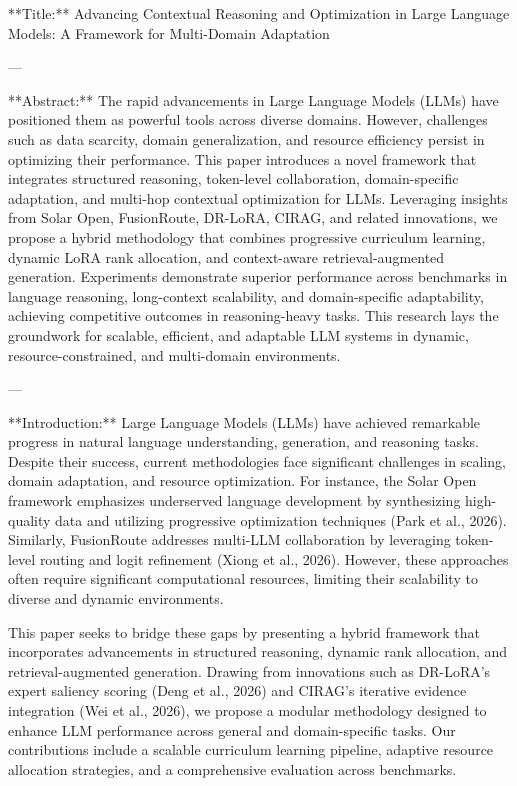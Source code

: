 **Title:** Advancing Contextual Reasoning and Optimization in Large Language Models: A Framework for Multi-Domain Adaptation  

---

**Abstract:**  
The rapid advancements in Large Language Models (LLMs) have positioned them as powerful tools across diverse domains. However, challenges such as data scarcity, domain generalization, and resource efficiency persist in optimizing their performance. This paper introduces a novel framework that integrates structured reasoning, token-level collaboration, domain-specific adaptation, and multi-hop contextual optimization for LLMs. Leveraging insights from Solar Open, FusionRoute, DR-LoRA, CIRAG, and related innovations, we propose a hybrid methodology that combines progressive curriculum learning, dynamic LoRA rank allocation, and context-aware retrieval-augmented generation. Experiments demonstrate superior performance across benchmarks in language reasoning, long-context scalability, and domain-specific adaptability, achieving competitive outcomes in reasoning-heavy tasks. This research lays the groundwork for scalable, efficient, and adaptable LLM systems in dynamic, resource-constrained, and multi-domain environments.

---

**Introduction:**  
Large Language Models (LLMs) have achieved remarkable progress in natural language understanding, generation, and reasoning tasks. Despite their success, current methodologies face significant challenges in scaling, domain adaptation, and resource optimization. For instance, the Solar Open framework emphasizes underserved language development by synthesizing high-quality data and utilizing progressive optimization techniques (Park et al., 2026). Similarly, FusionRoute addresses multi-LLM collaboration by leveraging token-level routing and logit refinement (Xiong et al., 2026). However, these approaches often require significant computational resources, limiting their scalability to diverse and dynamic environments.  

This paper seeks to bridge these gaps by presenting a hybrid framework that incorporates advancements in structured reasoning, dynamic rank allocation, and retrieval-augmented generation. Drawing from innovations such as DR-LoRA’s expert saliency scoring (Deng et al., 2026) and CIRAG’s iterative evidence integration (Wei et al., 2026), we propose a modular methodology designed to enhance LLM performance across general and domain-specific tasks. Our contributions include a scalable curriculum learning pipeline, adaptive resource allocation strategies, and a comprehensive evaluation across benchmarks.  

